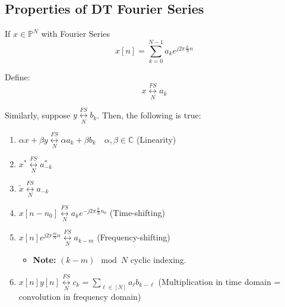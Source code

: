\subsection{Properties of DT Fourier Series}
\begin{definition}
    If \( x \in \mathbb{P}^N \) with Fourier Series
    \begin{equation*}
        x[n] = \sum_{k=0}^{N-1} a_k e^{j 2\pi \frac{k}{N} n}
    \end{equation*}

    Define:
    \begin{equation*}
        x \underset{N}{\overset{FS}{\leftrightarrow}} a_k
    \end{equation*}

    Similarly, suppose \( y \underset{N}{\overset{FS}{\leftrightarrow}} b_k \). Then, the following is true:

    \begin{enumerate}
        \item \( \alpha x + \beta y \underset{N}{\overset{FS}{\leftrightarrow}} \alpha a_k + \beta b_k \quad \alpha, \beta \in \mathbb{C} \) \hspace{10pt} (Linearity)

        \item \( x^* \underset{N}{\overset{FS}{\leftrightarrow}} a_{-k}^* \)

        \item \( \tilde{x} \underset{N}{\overset{FS}{\leftrightarrow}} a_{-k} \)

        \item \( x[n - n_0] \underset{N}{\overset{FS}{\leftrightarrow}} a_k e^{-j 2\pi \frac{k}{N} n_0} \) \hspace{10pt} (Time-shifting)

        \item \( x[n] e^{j 2\pi \frac{m}{N} n} \underset{N}{\overset{FS}{\leftrightarrow}} a_{k - m} \) \hspace{10pt} (Frequency-shifting)
        \begin{itemize}
            \item \textbf{Note:} \( (k - m) \mod N \) cyclic indexing.
        \end{itemize}

        \item \( x[n] y[n] \underset{N}{\overset{FS}{\leftrightarrow}} c_k = \sum_{\ell \in [N]} a_\ell b_{k - \ell} \) \hspace{10pt} (Multiplication in time domain = convolution in frequency domain)


\end{enumerate}
\end{definition}
